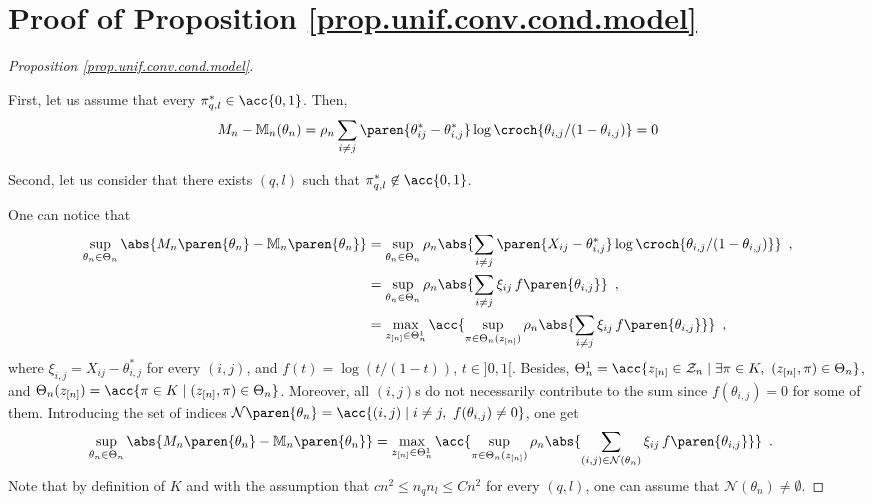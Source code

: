 \documentclass[11pt]{article}
\newtheorem{proof}{Proof}%
\newcommand{\zn}{z_{[n]}}
\newcommand{\Mn}{\mathbb{M}_{n}}
\begin{document}
\section{Proof of Proposition \ref{prop.unif.conv.cond.model}}\label{Appendix.prop.unif.conv.M1}
\begin{proof}[Proposition \ref{prop.unif.conv.cond.model}]
\

First, let us assume that every $\pi^*_{q,l} \in \acc{0,1}$.
%
Then,
\begin{align*}
        M_n-\mathbb{M}_n(\theta_n)=\rho_n\sum_{i\neq j} \paren{\theta^*_{ij}-\theta^*_{i,j}} \log \croch{\theta_{i,j}/(1-\theta_{i,j})}=0
\end{align*}

Second, let us consider that there exists $(q,l)$ such that  $\pi^*_{q,l}\not\in\acc{0,1}$.

One can notice that
\begin{align*}
\sup_{\theta_n\in\Theta_n}\abs{M_n\paren{\theta_n}-\Mn \paren{\theta_n}} & = \sup_{\theta_n\in\Theta_n} \rho_n\abs{\sum_{i\neq j} \paren{X_{ij}-\theta^*_{i,j}} \log \croch{\theta_{i,j}/(1-\theta_{i,j})}}\enspace,\\
        & = \sup_{\theta_n\in\Theta_n}\rho_n\abs{\sum_{i\neq j} \xi_{ij}\, f\paren{\theta_{i,j}}}\enspace,\\
& = \max_{\zn\in\Theta_n^1}\acc{\sup_{\pi\in\Theta_n(\zn)}\rho_n\abs{\sum_{i\neq j} \xi_{ij}\, f\paren{\theta_{i,j}}}}\enspace,
\end{align*}
\sloppy
where $\xi_{i,j}=X_{ij}-\theta^*_{i,j}$ for every $(i,j)$, and $f(t)=\log(t/(1-t))$, $t\in]0,1[$. Besides, $\Theta_n^1=\acc{\zn\in\mathcal{Z}_n\mid \exists \pi\in K,\ (\zn,\pi)\in\Theta_n}$, and $\Theta_n(\zn)=\acc{\pi\in K \mid (\zn,\pi)\in\Theta_n}$.
%
Moreover, all $(i,j)$s do not necessarily contribute to the sum since $f(\theta_{i,j})=0$ for some of them. Introducing the set of indices $\mathcal{N}\paren{\theta_n}=\acc{(i,j)\mid i\neq j,\ f(\theta_{i,j})\neq 0}$, one get
\begin{align*}
\sup_{\theta_n\in\Theta_n}\abs{M_n\paren{\theta_n}-\Mn \paren{\theta_n}} & = \max_{\zn\in\Theta_n^1}\acc{\sup_{\pi\in\Theta_n(\zn)}\rho_n\abs{\sum_{(i,j)\in\mathcal{N}(\theta_n)} \xi_{ij}\, f\paren{\theta_{i,j}}}}\enspace.
\end{align*}
%
Note that by definition of $K$ and with the assumption that $cn^2\leq n_qn_l\leq Cn^2$ for every $(q,l)$, one can assume that $\mathcal{N}(\theta_n)\neq  \emptyset$.

\medskip


\end{proof}
\end{document}
